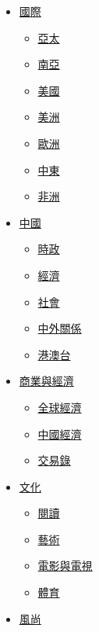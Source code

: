 \begin{itemize}
\tightlist
\item
  \href{/world/?utm_source=nav-footer}{國際}

  \begin{itemize}
  \tightlist
  \item
    \href{/asia-pacific/?utm_source=nav-footer}{亞太}
  \item
    \href{/south-asia/?utm_source=nav-footer}{南亞}
  \item
    \href{/usa/?utm_source=nav-footer}{美國}
  \item
    \href{/americas/?utm_source=nav-footer}{美洲}
  \item
    \href{/europe/?utm_source=nav-footer}{歐洲}
  \item
    \href{/mideast/?utm_source=nav-footer}{中東}
  \item
    \href{/africa/?utm_source=nav-footer}{非洲}
  \end{itemize}
\item
  \href{/china/?utm_source=nav-footer}{中國}

  \begin{itemize}
  \tightlist
  \item
    \href{/policy/?utm_source=nav-footer}{時政}
  \item
    \href{/china-ec/?utm_source=nav-footer}{經濟}
  \item
    \href{/society/?utm_source=nav-footer}{社會}
  \item
    \href{/foreign-relations/?utm_source=nav-footer}{中外關係}
  \item
    \href{/hk-taiwan/?utm_source=nav-footer}{港澳台}
  \end{itemize}
\item
  \href{/business/?utm_source=nav-footer}{商業與經濟}

  \begin{itemize}
  \tightlist
  \item
    \href{/global-ec/?utm_source=nav-footer}{全球經濟}
  \item
    \href{/china-ec/?utm_source=nav-footer}{中國經濟}
  \item
    \href{/dealbook/?utm_source=nav-footer}{交易錄}
  \end{itemize}
\item
  \href{/culture/?utm_source=nav-footer}{文化}

  \begin{itemize}
  \tightlist
  \item
    \href{/books/?utm_source=nav-footer}{閱讀}
  \item
    \href{/art/?utm_source=nav-footer}{藝術}
  \item
    \href{/film-tv/?utm_source=nav-footer}{電影與電視}
  \item
    \href{/sports/?utm_source=nav-footer}{體育}
  \end{itemize}
\item
  \href{/style/?utm_source=nav-footer}{風尚}


\end{itemize}

